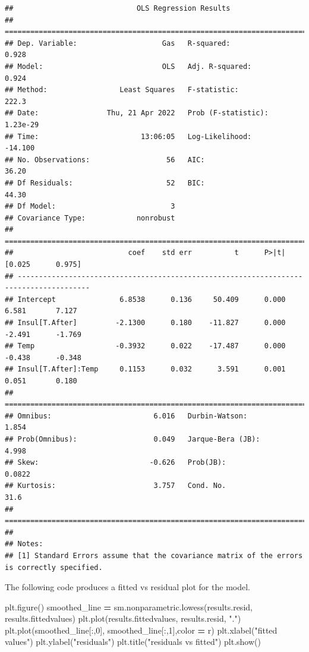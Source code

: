 \documentclass[
]{book}
\newenvironment{Shaded}{\begin{snugshade}}{\end{snugshade}}
\newcommand{\DecValTok}[1]{\textcolor[rgb]{0.00,0.00,0.81}{#1}}
\newcommand{\NormalTok}[1]{#1}
\newcommand{\OperatorTok}[1]{\textcolor[rgb]{0.81,0.36,0.00}{\textbf{#1}}}
\newcommand{\StringTok}[1]{\textcolor[rgb]{0.31,0.60,0.02}{#1}}
\begin{document}
\begin{verbatim}
##                             OLS Regression Results                            
## ==============================================================================
## Dep. Variable:                    Gas   R-squared:                       0.928
## Model:                            OLS   Adj. R-squared:                  0.924
## Method:                 Least Squares   F-statistic:                     222.3
## Date:                Thu, 21 Apr 2022   Prob (F-statistic):           1.23e-29
## Time:                        13:06:05   Log-Likelihood:                -14.100
## No. Observations:                  56   AIC:                             36.20
## Df Residuals:                      52   BIC:                             44.30
## Df Model:                           3                                         
## Covariance Type:            nonrobust                                         
## =======================================================================================
##                           coef    std err          t      P>|t|      [0.025      0.975]
## ---------------------------------------------------------------------------------------
## Intercept               6.8538      0.136     50.409      0.000       6.581       7.127
## Insul[T.After]         -2.1300      0.180    -11.827      0.000      -2.491      -1.769
## Temp                   -0.3932      0.022    -17.487      0.000      -0.438      -0.348
## Insul[T.After]:Temp     0.1153      0.032      3.591      0.001       0.051       0.180
## ==============================================================================
## Omnibus:                        6.016   Durbin-Watson:                   1.854
## Prob(Omnibus):                  0.049   Jarque-Bera (JB):                4.998
## Skew:                          -0.626   Prob(JB):                       0.0822
## Kurtosis:                       3.757   Cond. No.                         31.6
## ==============================================================================
## 
## Notes:
## [1] Standard Errors assume that the covariance matrix of the errors is correctly specified.
\end{verbatim}

The following code produces a fitted vs residual plot for the model.

\begin{Shaded}
\begin{Highlighting}[]
\NormalTok{plt.figure()}
\NormalTok{smoothed\_line }\OperatorTok{=}\NormalTok{ sm.nonparametric.lowess(results.resid, results.fittedvalues)}
\NormalTok{plt.plot(results.fittedvalues, results.resid, }\StringTok{"."}\NormalTok{)}
\NormalTok{plt.plot(smoothed\_line[:,}\DecValTok{0}\NormalTok{], smoothed\_line[:,}\DecValTok{1}\NormalTok{],color }\OperatorTok{=} \StringTok{\textquotesingle{}r\textquotesingle{}}\NormalTok{)}
\NormalTok{plt.xlabel(}\StringTok{"fitted values"}\NormalTok{)}
\NormalTok{plt.ylabel(}\StringTok{"residuals"}\NormalTok{)}
\NormalTok{plt.title(}\StringTok{"residuals vs fitted"}\NormalTok{)}
\NormalTok{plt.show()}
\end{Highlighting}
\end{Shaded}
\end{document}
